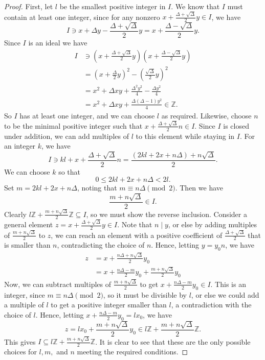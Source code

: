 \documentclass[honours,12pt]{unswthesis}
\newcommand{\Z}{\mathbb{Z}} %
\newcommand{\divides}{\mathrel{|}}
\numberwithin{equation}{section}
\begin{document}
\begin{proof}
    First, let $l$ be the smallest positive integer in $I$.
    We know that $I$ must contain at least one integer, since for any nonzero $x + \frac{\Delta + \sqrt\Delta}{2}y \in I$, we have 
    $$I \ni x + \Delta y - \frac{\Delta + \sqrt\Delta}{2}y = x + \frac{\Delta - \sqrt\Delta}{2}y.$$
    Since $I$ is an ideal we have
    \begin{align*}
        I &\ni \left( x + \frac{\Delta + \sqrt\Delta}{2}y \right) \left( x + \frac{\Delta - \sqrt\Delta}{2}y \right) \\
        &= \left( x + \frac{\Delta}{2}y \right)^2 -  \left( \frac{\sqrt\Delta}{2}y \right)^2 \\
        &= x^2 + \Delta xy + \frac{\Delta^2 y^2}{4} - \frac{\Delta y^2}{4} \\
        &= x^2 + \Delta xy + \frac{\Delta(\Delta - 1)y^2}{4} \in \Z.
    \end{align*}
    So $I$ has at least one integer, and we can choose $l$ as required.
    Likewise, choose $n$ to be the minimal positive integer such that $x + \frac{\Delta + \sqrt\Delta}{2}n \in I$.
    Since $I$ is closed under addition, we can add multiples of $l$ to this element while staying in $I$.
    For an integer $k$, we have
    $$I \ni kl + x + \frac{\Delta + \sqrt\Delta}{2}n = \frac{(2kl + 2x + n\Delta) + n\sqrt\Delta}{2}.$$
    We can choose $k$ so that
    $$0 \leq 2kl + 2x + n\Delta < 2l.$$
    Set $m = 2kl + 2x + n\Delta$, noting that $m \equiv n\Delta \pmod{2}$.
    Then we have
    $$\frac{m + n\sqrt\Delta}{2} \in I.$$
    Clearly $l\Z + \frac{m + n\sqrt\Delta}{2}\Z \subseteq I$, so we must show the reverse inclusion.
    Consider a general element $z = x + \frac{\Delta + \sqrt\Delta}{2}y \in I$. 
    Note that $n \divides y$, or else by adding multiples of $\frac{m + n\sqrt\Delta}{2}$ to $z$, we can reach an element with a positive coefficient of $\frac{\Delta + \sqrt\Delta}{2}$ that is smaller than $n$, contradicting the choice of $n$.
    Hence, letting $y = y_0 n$, we have
    \begin{align*}
        z &= x + \frac{n\Delta + n\sqrt\Delta}{2}y_0 \\
        &= x + \frac{n\Delta - m}{2}y_0 + \frac{m + n\sqrt\Delta}{2}y_0
    \end{align*}
    Now, we can subtract multiples of $\frac{m + n\sqrt\Delta}{2}$ to get $x + \frac{n\Delta - m}{2}y_0 \in I$. 
    This is an integer, since $m \equiv n\Delta \pmod{2}$, so it must be divisible by $l$, or else we could add a multiple of $l$ to get a positive integer smaller than $l$, a contradiction with the choice of $l$.
    Hence, letting $x + \frac{n\Delta - m}{2}y_0 = lx_0$, we have
    $$z = lx_0 + \frac{m + n\sqrt\Delta}{2}y_0 \in l\Z + \frac{m + n\sqrt\Delta}{2}\Z.$$
    This gives $I \subseteq l\Z + \frac{m + n\sqrt\Delta}{2}\Z$.
    It is clear to see that these are the only possible choices for $l, m,$ and $n$ meeting the required conditions.
\end{proof}
\end{document}
